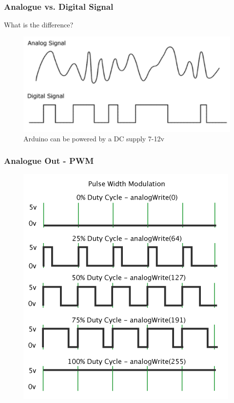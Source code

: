 \begin{frame}
	\frametitle{Analogue vs. Digital Signal}
	What is the difference? 
	
	\pause
	 \begin{figure}
		\includegraphics[scale=.25]{assets/dva} 
		\caption{Arduino can be powered by a DC supply 7-12v}

	\end{figure}
\end{frame}

\begin{frame}
	\frametitle{Analogue Out - PWM}
	\begin{figure}
   		\includegraphics[scale=.4]{assets/pwm} 
	\end{figure}
\end{frame}



